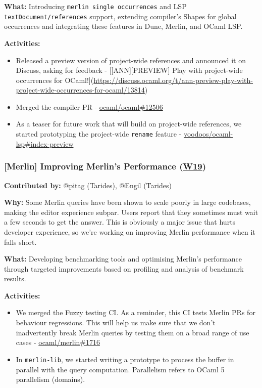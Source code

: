 \documentclass[11pt]{article}
\begin{document}
\textbf{What:} Introducing \texttt{merlin single occurrences} and LSP \texttt{textDocument/references} support, extending compiler's Shapes for global
occurrences and integrating these features in Dune, Merlin, and OCaml LSP.

\textbf{Activities:}
\begin{itemize}
\item Released a preview version of project-wide references and announced it on Discuss, asking for feedback - [[ANN][PREVIEW] Play with project-wide occurrences for OCaml!](\url{https://discuss.ocaml.org/t/ann-preview-play-with-project-wide-occurrences-for-ocaml/13814})
\item Merged the compiler PR - \href{https://github.com/ocaml/ocaml/pull/12508}{ocaml/ocaml\#12506}
\item As a teaser for future work that will build on project-wide references, we started prototyping the project-wide \texttt{rename} feature - \href{https://github.com/voodoos/ocaml-lsp/tree/index-preview}{voodoos/ocaml-lsp\#index-preview}
\end{itemize}
\subsubsection*{\textbf{{[}Merlin]} Improving Merlin's Performance (\href{https://ocaml.org/docs/platform-roadmap\#w19-navigate-code}{W19})}
\label{sec:org34a301d}

\textbf{Contributed by:} @pitag (Tarides), @Engil (Tarides)

\textbf{Why:} Some Merlin queries have been shown to scale poorly in large codebases, making the editor experience subpar. Users report
that they sometimes must wait a few seconds to get the answer. This is obviously a major issue that hurts developer experience, so
we're working on improving Merlin performance when it falls short.

\textbf{What:} Developing benchmarking tools and optimising Merlin's performance through targeted improvements based on profiling and
analysis of benchmark results.

\textbf{Activities:}
\begin{itemize}
\item We merged the Fuzzy testing CI. As a reminder, this CI tests Merlin PRs for behaviour regressions. This will help us make sure that we don't inadvertently break Merlin queries by testing them on a broad range of use cases - \href{https://github.com/ocaml/merlin/pull/1716}{ocaml/merlin\#1716}
\item In \texttt{merlin-lib}, we started writing a prototype to process the buffer in parallel with the query computation. Parallelism refers to OCaml 5 parallelism (domains).
\end{itemize}
\end{document}
